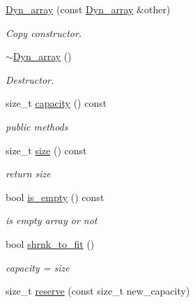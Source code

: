 \begin{DoxyCompactItemize}
\hyperlink{classDyn__array_a83d19f61fc7cef07e8125911729fd3bf}{Dyn\+\_\+array} (const \hyperlink{classDyn__array}{Dyn\+\_\+array} \&other)
\begin{DoxyCompactList}\small\item\em Copy constructor. \end{DoxyCompactList}\item 
\mbox{\label{classDyn__array_ae614e37ca129444d7125483d461fa8d5}} 
\hyperlink{classDyn__array_ae614e37ca129444d7125483d461fa8d5}{$\sim$\+Dyn\+\_\+array} ()
\begin{DoxyCompactList}\small\item\em Destructor. \end{DoxyCompactList}\item 
size\+\_\+t \hyperlink{classDyn__array_a36c5289ec13ee40366fe3b095b2347bf}{capacity} () const
\begin{DoxyCompactList}\small\item\em public methods \end{DoxyCompactList}\item 
\mbox{\label{classDyn__array_abe033b7d651c88c537692a4ac9815355}} 
size\+\_\+t \hyperlink{classDyn__array_abe033b7d651c88c537692a4ac9815355}{size} () const
\begin{DoxyCompactList}\small\item\em return size \end{DoxyCompactList}\item 
\mbox{\label{classDyn__array_a43a702b997406bcf8426c9b2ce413693}} 
bool \hyperlink{classDyn__array_a43a702b997406bcf8426c9b2ce413693}{is\+\_\+empty} () const
\begin{DoxyCompactList}\small\item\em is empty array or not \end{DoxyCompactList}\item 
\mbox{\label{classDyn__array_a021f3baee09ae4cc91a450d5f60cb318}} 
bool \hyperlink{classDyn__array_a021f3baee09ae4cc91a450d5f60cb318}{shrnk\+\_\+to\+\_\+fit} ()
\begin{DoxyCompactList}\small\item\em capacity = size \end{DoxyCompactList}\item 
size\+\_\+t \hyperlink{classDyn__array_a8cc1e876bc20ce13490898be4bdd7882}{reserve} (const size\+\_\+t new\+\_\+capacity)

\end{DoxyCompactItemize}
